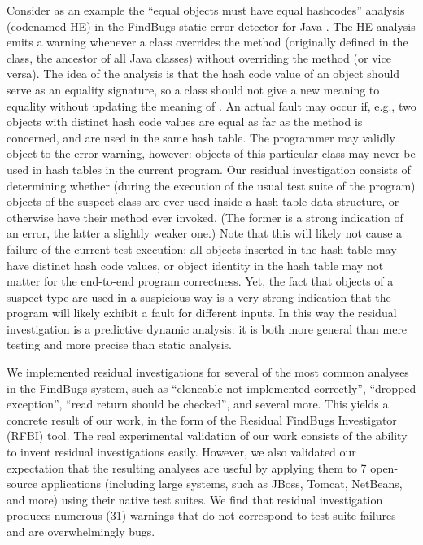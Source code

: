\documentclass[proposal]{umthesis} %
\begin{document}
Consider as an example the ``equal objects must have equal hashcodes''
analysis (codenamed HE) in the FindBugs static error detector for Java
\cite{hovemeyer04finding,hovemeyer07finding,Ayewah:2010:GFF:1831708.1831738}. The HE
analysis emits a warning whenever a class overrides the method
 (originally defined in the  class, the
ancestor of all Java classes) without overriding the 
method (or vice versa). The idea of the analysis is that the hash code
value of an object should serve as an equality signature, so a class
should not give a new meaning to equality without updating the meaning
of . An actual fault may occur if, e.g., two objects
with distinct hash code values are equal as far as the 
method is concerned, and are used in the same hash table. 
The programmer may validly object to the error
warning, however: objects of this particular class may never be used
in hash tables in the current program.  Our residual investigation
consists of determining whether (during the execution of the usual
test suite of the program) objects of the suspect class are ever
used inside a hash table data structure, or otherwise have their
 method ever invoked. (The former is a strong indication
of an error, the latter a slightly weaker one.)  Note that this will
likely not cause a failure of the current test execution: all objects
inserted in the hash table may have distinct hash code values, or
object identity in the hash table may not matter for the end-to-end
program correctness. Yet, the fact that objects of a suspect type
are used in a suspicious way is a very strong indication that the
program will likely exhibit a fault for different inputs. In this way
the residual investigation is a predictive dynamic analysis: it is
both more general than mere testing and more precise than static analysis.

We implemented residual investigations for several of the most common analyses in the FindBugs system, such as “cloneable not implemented correctly”, “dropped exception”, “read return should be checked”, and several more. This yields a concrete result of our work, in the form of the Residual FindBugs Investigator (RFBI) tool.  The real experimental validation of our work consists of the ability to invent residual investigations easily. However, we also validated our expectation that the resulting analyses are useful by applying them to 7 open-source applications (including large systems, such as JBoss, Tomcat, NetBeans, and more) using their native test suites. We find that residual investigation produces numerous (31) warnings that do not correspond to test suite failures and are overwhelmingly bugs.
\end{document}
